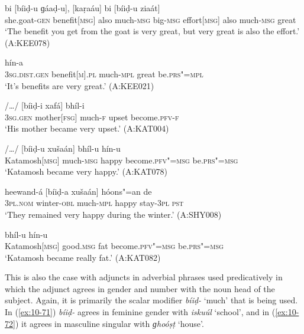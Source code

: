 \begin{exe}
\ex
\label{ex:10-65}
\gll [čhéel"=ii phaaidá] bi [bíiḍ-u ɡáaḍ-u], [kaṛaáu] bi [bíiḍ-u ziaát] \\
she.goat-\textsc{gen} benefit[\textsc{msg}] also much-\textsc{msg} big-\textsc{msg}  effort[\textsc{msg}] also much-\textsc{msg} great \\
\glt `The benefit you get from the goat is very great, but very great is also the effort.' (A:KEE078)

\ex
\label{ex:10-66}
 hín-a \\
\textsc{3sg}.\textsc{dist.gen} benefit[\textsc{m}].\textsc{pl} much-\textsc{mpl} great  be.\textsc{prs"=mpl} \\
\glt `It's benefits are very great.' (A:KEE021)

\ex
\label{ex:10-67}
 /{\ldots}/ [bíiḍ-i xafá] bhíl-i \\
\textsc{3sg.gen} mother[\textsc{fsg}] {} much-\textsc{f} upset become.\textsc{pfv-f} \\
\glt `His mother became very upset.' (A:KAT004)

\ex
\label{ex:10-68}
\gll [kaṭamúš] /{\ldots}/ [bíiḍ-u xušaán] bhíl-u hín-u \\
Katamosh[\textsc{msg}] {} much-\textsc{msg} happy become.\textsc{pfv"=msg} be.\textsc{prs"=msg}\\
\glt `Katamosh became very happy.' (A:KAT078)

\ex
\label{ex:10-69}
\gll [se] heewand-á [bíiḍ-a xušaán] hóons"=an de \\
\textsc{3pl.nom} winter-\textsc{obl} much-\textsc{mpl} happy stay-\textsc{3pl} \textsc{pst} \\
\glt `They remained very happy during the winter.' (A:SHY008)

\ex
\label{ex:10-70}
 bhíl-u hín-u \\
Katamosh[\textsc{msg}] good.\textsc{msg} fat become.\textsc{pfv"=msg}  be.\textsc{prs"=msg} \\
\glt `Katamosh became really fat.' (A:KAT082)
\end{exe}

This is also the case with adjuncts in adverbial phrases used predicatively in which the adjunct agrees in gender and number with the noun head of the subject. Again, it is primarily the scalar modifier \textit{bíiḍ-} `much' that is being used. In (\ref{ex:10-71}) \textit{bíiḍ-} agrees in feminine gender with \textit{iskuúl} `school', and in (\ref{ex:10-72}) it agrees in masculine singular with \textit{ɡhoóṣṭ} `house'. 

